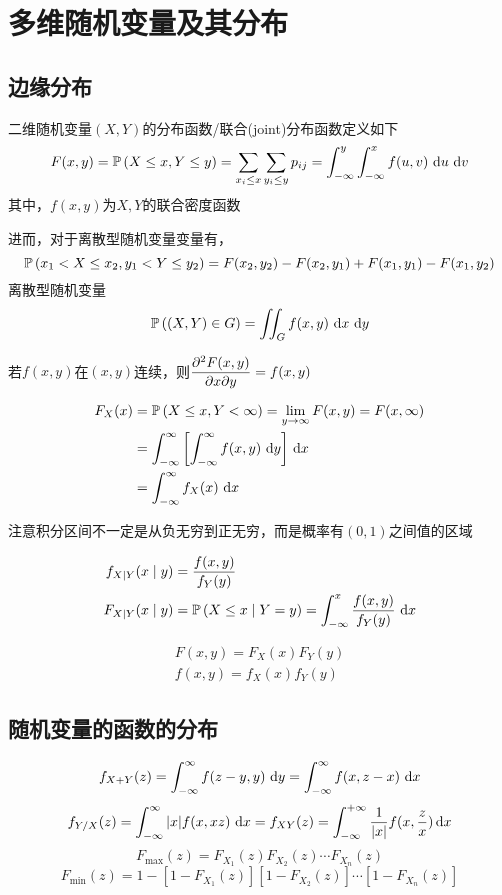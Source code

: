 
\section{多维随机变量及其分布}
\subsection{边缘分布}
\begin{definition}
二维随机变量$(X,Y)$的分布函数/联合(joint)分布函数定义如下
\[F(x,y)=\mathbb{P}\left(X\leq x,Y\leq y\right)=\displaystyle\sum_{x_i\leq x}\sum_{y_i\leq y}p_{ij}=\displaystyle\int_{-\infty}^{y}\int_{-\infty}^{x}f(u,v)\,\,\mathrm{d} u\,\,\mathrm{d} v\]
其中，$f(x,y)$为$X,Y$的联合密度函数
\end{definition}
进而，对于离散型随机变量变量有，
\[\mathbb{P}\left(x_1<X\leq x_2,y_1<Y\leq y_2\right)=F(x_2,y_2)-F(x_2,y_1)+F(x_1,y_1)-F(x_1,y_2)\]
离散型随机变量
\[\mathbb{P}\left((X,Y)\in G\right)=\iint_G f(x,y)\,\,\mathrm{d} x\,\,\mathrm{d} y\]
\par 若$f(x,y)$在$(x,y)$连续，则$\dfrac{\partial^2 F(x,y)}{\partial x\partial y}=f(x,y)$

\begin{definition}[边缘(marginal)分布]
\[\begin{aligned}
F_X(x)&=\mathbb{P}\left(X\leq x,Y<\infty\right)=\lim_{y\to\infty}F(x,y)=F(x,\infty)\\
&=\displaystyle\int_{-\infty}^{\infty}{\left[\displaystyle\int_{-\infty}^{\infty}{f(x,y)}\,\,\mathrm{d} y\right]}\,\,\mathrm{d} x\\
&=\displaystyle\int_{-\infty}^{\infty}{f_X(x)}\,\,\mathrm{d} x
\end{aligned}\]
\end{definition}
注意积分区间不一定是从负无穷到正无穷，而是概率有$(0,1)$之间值的区域

\begin{definition}[条件概率密度与分布函数]
\[\begin{aligned}
f_{X\mid Y}(x\mid y)&=\dfrac{f(x,y)}{f_Y(y)}\\
F_{X\mid Y}(x\mid y)&=\mathbb{P}\left(X\leq x\mid Y=y\right)=\displaystyle\int_{-\infty}^{x}{\dfrac{f(x,y)}{f_Y(y)}}\,\,\mathrm{d} x
\end{aligned}\]
\end{definition}
\begin{definition}[相互独立]
\[\begin{aligned}
F(x,y)=F_X(x)F_Y(y)\\
f(x,y)=f_X(x)f_Y(y)
\end{aligned}\]
\end{definition}

\subsection{随机变量的函数的分布}
\[f_{X+Y}(z)=\displaystyle\int_{-\infty}^{\infty}{f(z-y,y)}\,\,\mathrm{d} y=\displaystyle\int_{-\infty}^{\infty}{f(x,z-x)}\,\,\mathrm{d} x\]
\[f_{Y/X}(z)=\displaystyle\int_{-\infty}^{\infty}{|x|f(x,xz)}\,\,\mathrm{d} x=f_{XY}(z)=\displaystyle\int_{-\infty}^{+\infty}\dfrac{1}{|x|}f(x,\dfrac{z}{x})\,\mathrm{d} x\]
\[F_{\max}(z)=F_{X_1}(z)F_{X_2}(z)\cdots F_{X_n}(z)\]
\[F_{\min}(z)=1-[1-F_{X_1}(z)][1-F_{X_2}(z)]\cdots [1-F_{X_n}(z)]\]

